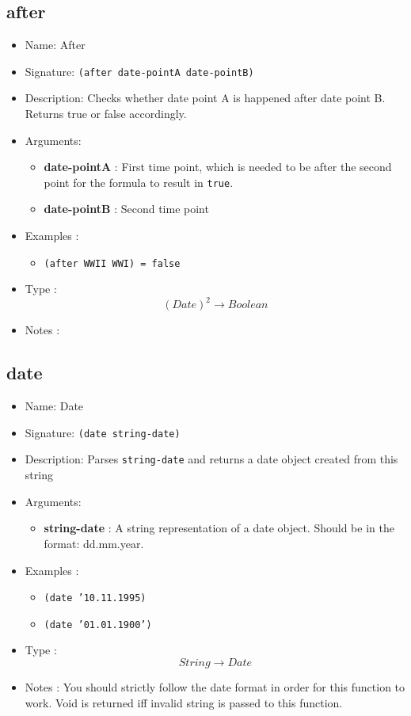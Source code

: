 \subsection{after}
\begin{itemize}
    \item Name: After
    \item Signature: \texttt{(after date-pointA date-pointB)}
    \item Description: Checks whether date point A is happened after date point B. Returns true or false accordingly.
    \item Arguments:
        \begin{itemize}
            \item \textbf{date-pointA} : First time point, which is needed to be after the second point for the formula to result in \texttt{true}.
            \item \textbf{date-pointB} : Second time point
        \end{itemize}
    \item Examples :
        \begin{itemize}
            \item \texttt{(after WWII WWI) = false}
        \end{itemize}
    \item Type : \[(Date)^2 \to Boolean\]
    \item Notes :
\end{itemize}

\subsection{date}
\begin{itemize}
    \item Name: Date
    \item Signature: \texttt{(date string-date)}
    \item Description: Parses \texttt{string-date} and returns a date object created from this string
    \item Arguments:
        \begin{itemize}
            \item \textbf{string-date} : A string representation of a date object. Should be in the format: dd.mm.year.
        \end{itemize}
    \item Examples :
        \begin{itemize}
            \item \texttt{(date '10.11.1995)}
            \item \texttt{(date '01.01.1900')}
        \end{itemize}
    \item Type : \[String \to Date\]
    \item Notes : You should strictly follow the date format in order for this function to work. Void is returned iff invalid string is passed to this function.
\end{itemize}

